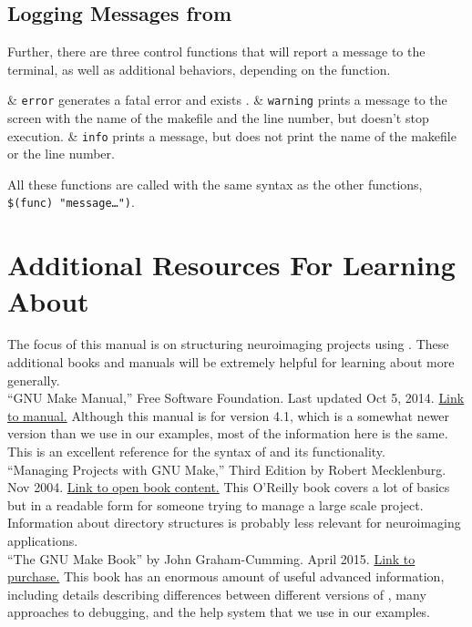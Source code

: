 \subsection{Logging Messages from \maken}

Further, there are three \maken{} control functions that will report a message to the terminal, as well as additional behaviors, depending on the function.

\begin{easylist}[itemize]
	& \texttt{error} generates a fatal error and exists \maken{}.
	& \texttt{warning} prints a message to the screen with the name of the makefile and the line number, but doesn't stop execution.
	& \texttt{info} prints a message, but does not print the name of the makefile or the line number.
\end{easylist}

All these functions are called with the same syntax as the other functions, \texttt{\$({\color{blue}func}) "message\ldots")}.

\section{Additional Resources For Learning About \maken{}}
The focus of this manual is on structuring neuroimaging projects using \maken{}. These additional books and manuals will be extremely helpful for learning about \maken{} more generally. \\

``GNU Make Manual,'' Free Software Foundation. Last updated Oct 5, 2014. \href{http://www.gnu.org/software/make/manual/}{Link to manual.} Although this manual is for version 4.1, which is a somewhat newer version than we use in our examples, most of the information here is the same. This is an excellent reference for the syntax of \maken{} and its functionality. 
\\

``Managing Projects with GNU Make,'' Third Edition by Robert Mecklenburg. Nov 2004. \href{http://www.oreilly.com/openbook/make3/book/index.csp}{Link to open book content.} This O'Reilly book covers a lot of basics but in a readable form for someone trying to manage a large scale project. Information about directory structures is probably less relevant for neuroimaging applications. 
\\

``The GNU Make Book'' by John Graham-Cumming. April 2015. \href{https://www.nostarch.com/gnumake}{Link to purchase.} This book has an enormous amount of useful advanced information, including details describing differences between different versions of \maken{}, many approaches to debugging, and the help system that we use in our examples. 
